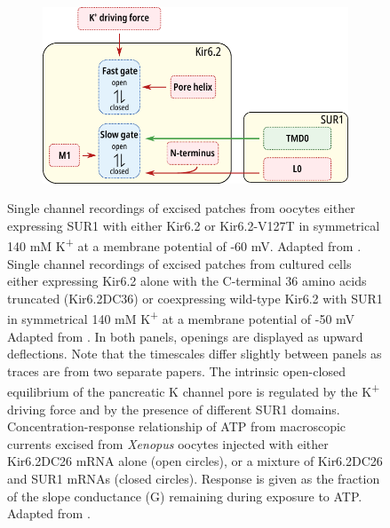 \begin{figure}[h]
\begin{subfigure}[t]{0.45\textwidth}
	\end{subfigure}
	\hfill
	\begin{subfigure}[t]{0.45\textwidth}
		\caption{}\label{ch1fig:intrinsic_diagram}
		\centering
		\includegraphics[width=\textwidth]{regulation_diagram_2.pdf}
	\end{subfigure}
	\caption[Intrinsic regulation of Kir6.2 gating]{
		 Single channel recordings of excised patches from oocytes either expressing SUR1 with either Kir6.2 or Kir6.2-V127T in symmetrical 140 mM K\textsuperscript{+} at a membrane potential of -60 mV.
		Adapted from \cite{proks_mutations_2001}.
		 Single channel recordings of excised patches from cultured cells either expressing Kir6.2 alone with the C-terminal 36 amino acids truncated (Kir6.2\textgreek{D}C36) or coexpressing wild-type Kir6.2 with SUR1 in symmetrical 140 mM K\textsuperscript{+} at a membrane potential of -50 mV
		Adapted from \cite{enkvetchakul_kinetic_2000-1}.
		In both panels, openings are displayed as upward deflections.
		Note that the timescales differ slightly between panels as traces are from two separate papers.
		 The intrinsic open-closed equilibrium of the pancreatic K\ATP{} channel pore is regulated by the K\textsuperscript{+} driving force and by the presence of different SUR1 domains.
		 Concentration-response relationship of ATP from macroscopic currents excised from \textit{Xenopus} oocytes injected with either Kir6.2\textgreek{D}C26 mRNA alone (open circles), or a mixture of Kir6.2\textgreek{D}C26 and SUR1 mRNAs (closed circles).
		Response is given as the fraction of the slope conductance (G) remaining during exposure to ATP.
		Adapted from \cite{tucker_truncation_1997}.
	}
\end{figure}

